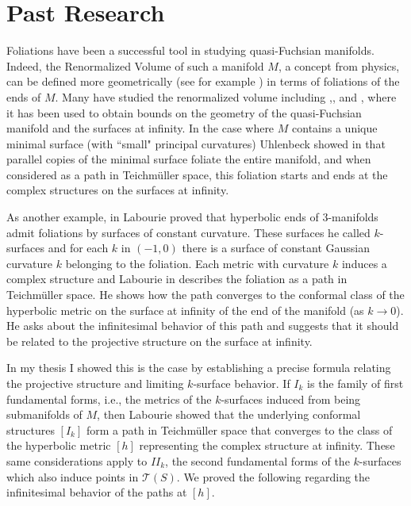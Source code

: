 \documentclass[11pt]{amsart}
\begin{document}
\section{Past Research}
Foliations have been a successful tool in studying quasi-Fuchsian manifolds.
Indeed, the Renormalized Volume of such a manifold $M$, a concept from physics, can be defined more geometrically (see for example \cite{krasnov-schlenker2008}) in terms of foliations of the ends of $M$. 
Many have studied the renormalized volume including \cite{schlenker2013},\cite{ciobotaru-moroianu2016}, and \cite{bridgeman-brock-bromberg2019}, where it has been used to obtain bounds on the geometry of the quasi-Fuchsian manifold and the surfaces at infinity. 
In the case where $M$ contains a unique minimal surface (with ``small" principal curvatures)  Uhlenbeck showed in \cite{uhlenbeck1983} that parallel copies of the minimal surface foliate the entire manifold, and when considered as a path in Teichm\"uller space, this foliation starts and ends at the complex structures on the surfaces at infinity.

As another example, in \cite{labourie1991} Labourie proved that hyperbolic ends of 3-manifolds admit foliations by surfaces of constant curvature. 
These surfaces he called $k$-surfaces and for each $k$ in $(-1,0)$ there is a surface of constant Gaussian curvature $k$ belonging to the foliation. 
Each metric with curvature $k$ induces a complex structure and Labourie in \cite{labourie1992} describes the foliation as a path in Teichm\"uller space. 
He shows how the path converges to the conformal class of the hyperbolic metric on the surface at infinity of the end of the manifold (as $k \to 0$).
He asks about the infinitesimal behavior of this path and suggests that it should be related to the projective structure on the surface at infinity. 

In my thesis \cite{quinn2020} I showed this is the case by establishing a precise formula relating the projective structure and limiting $k$-surface behavior.
If $I_k$ is the family of first fundamental forms, i.e., the metrics of the $k$-surfaces induced from being submanifolds of $M$, then Labourie showed that the underlying conformal structures $[I_k]$ form a path in Teichm\"uller space that converges to the class of the hyperbolic metric $[h]$ representing the complex structure at infinity. 
These same considerations apply to $I\!I_k$, the second fundamental forms of the $k$-surfaces which also induce points in $\mathcal{T}(S)$. 
We proved the following regarding the infinitesimal behavior of the paths at $[h]$.
\end{document}

